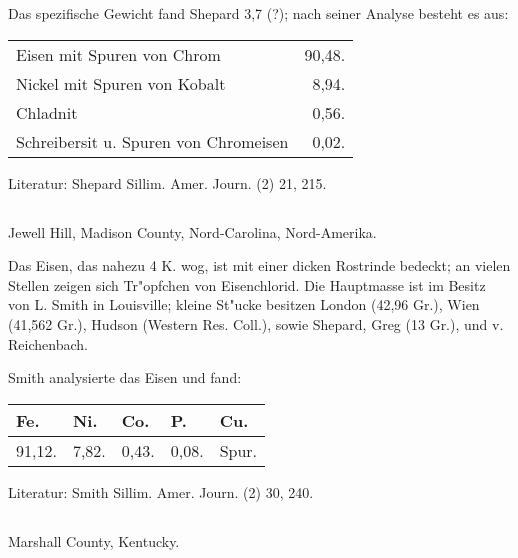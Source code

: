 \documentclass[a4paper, 11pt, oneside]{article}
\begin{document}
Das spezifische Gewicht fand Shepard 3,7 (?); nach seiner Analyse besteht es aus:
\begin{table}[H]
    \centering\swabfamily\Large
    \begin{tabular}{l r}
        Eisen mit Spuren von Chrom & 90,48. \\
        Nickel mit Spuren von Kobalt & 8,94. \\
        Chladnit & 0,56. \\
        Schreibersit u. Spuren von Chromeisen & 0,02. \\
    \end{tabular}
\end{table}

\normalsize
Literatur: Shepard Sillim. Amer. Journ. (2) 21, 215.

\subsection{}
\LARGE
\paragraph{}
Jewell Hill, Madison County, Nord-Carolina, Nord-Amerika.

Das Eisen, das nahezu 4 K. wog, ist mit einer dicken Rostrinde bedeckt; an vielen Stellen zeigen sich Tr"opfchen von Eisenchlorid. Die Hauptmasse ist im Besitz von L. Smith in Louisville; kleine St"ucke besitzen London (42,96 Gr.), Wien (41,562 Gr.), Hudson (Western Res. Coll.), sowie Shepard, Greg (13 Gr.), und v. Reichenbach.

Smith analysierte das Eisen und fand:
\begin{table}[H]
    \centering\swabfamily\Large
    \begin{tabular}{l l l l l}
        Fe. & Ni. & Co. & P. & Cu. \\ \hline
        91,12. & 7,82. & 0,43. & 0,08. & Spur. \\
    \end{tabular}
\end{table}

\normalsize
Literatur: Smith Sillim. Amer. Journ. (2) 30, 240.

\subsection{}
\LARGE
\paragraph{}
Marshall County, Kentucky.
\end{document}
